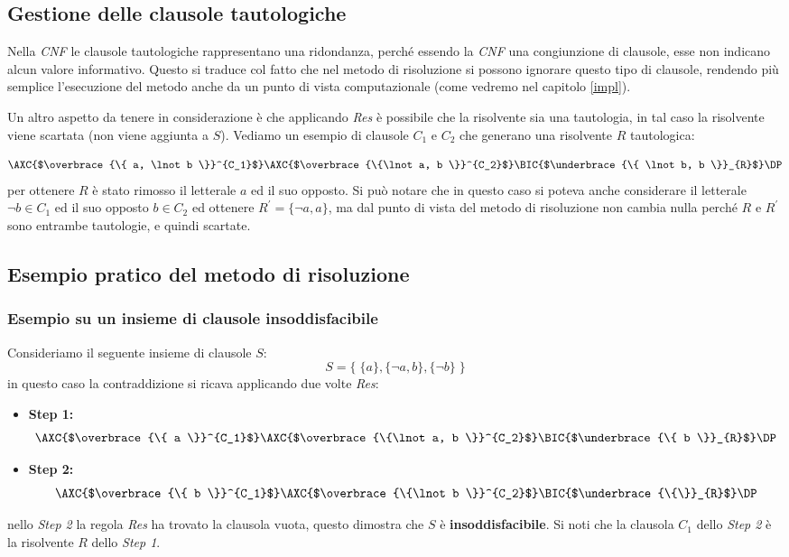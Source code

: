 \documentclass[a4paper,12pt]{report}
\begin{document}
\subsection{Gestione delle clausole tautologiche}
Nella \emph{CNF} le clausole tautologiche rappresentano una ridondanza, perché essendo la \emph{CNF} una congiunzione di clausole, esse non indicano alcun valore informativo. Questo si traduce col fatto che nel metodo di risoluzione si possono ignorare questo tipo di clausole, rendendo più semplice l'esecuzione del metodo anche da un punto di vista computazionale (come vedremo nel capitolo \ref{impl}).

Un altro aspetto da tenere in considerazione è che applicando \emph{Res} è possibile che la risolvente sia una tautologia, in tal caso la risolvente viene scartata (non viene aggiunta a $S$). Vediamo un esempio di clausole $C_1$ e $C_2$ che generano una risolvente $R$ tautologica:

\[
    \AXC{$\overbrace{\{ a, \lnot b \}}^{C_1}$}
    \AXC{$\overbrace{\{\lnot a, b \}}^{C_2}$}
    \RightLabel{Res}
    \BIC{$\underbrace{\{ \lnot b, b \}}_{R}$}
    \DP
\]
per ottenere $R$ è stato rimosso il letterale $a$ ed il suo opposto. Si può notare che in questo caso si poteva anche considerare il letterale $\lnot b \in C_1$ ed il suo opposto $b \in C_2$ ed ottenere $R^{'} = \{ \lnot a, a \}$, ma dal punto di vista del metodo di risoluzione non cambia nulla perché $R$ e $R^{'}$ sono entrambe tautologie, e quindi scartate.

\subsection{Esempio pratico del metodo di risoluzione}
\subsubsection{Esempio su un insieme di clausole insoddisfacibile}
Consideriamo il seguente insieme di clausole $S$:
\[ S = \{ \; \{a\}, \{\lnot a, b\}, \{\lnot b\} \; \} \]
in questo caso la contraddizione si ricava applicando due volte \emph{Res}:

\begin{itemize}
    \item \textbf{Step 1:}
    \[
    \AXC{$\overbrace{\{ a \}}^{C_1}$}
    \AXC{$\overbrace{\{\lnot a, b \}}^{C_2}$}
    \RightLabel{Res}
    \BIC{$\underbrace{\{ b \}}_{R}$}
    \DP
    \]
    \item \textbf{Step 2:}
    \[
    \AXC{$\overbrace{\{ b \}}^{C_1}$}
    \AXC{$\overbrace{\{\lnot b \}}^{C_2}$}
    \RightLabel{Res}
    \BIC{$\underbrace{\{\}}_{R}$}
    \DP
    \]
\end{itemize}
nello \emph{Step 2} la regola \emph{Res} ha trovato la clausola vuota, questo dimostra che $S$ è \textbf{insoddisfacibile}. Si noti che la clausola $C_1$ dello \emph{Step 2} è la risolvente $R$ dello \emph{Step 1}.
\end{document}
